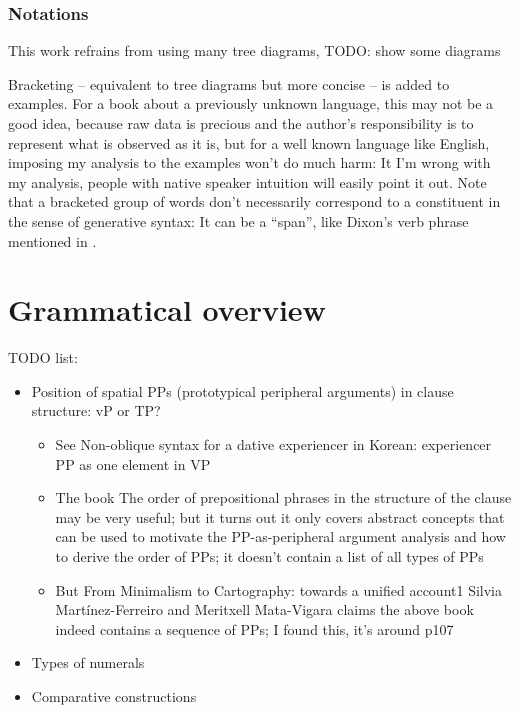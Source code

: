 \documentclass[UTF8, a4paper, oneside, scheme=plain]{ctexrep}
\begin{document}
\subsection{Notations}

This work refrains from using many tree diagrams, TODO: show some diagrams

Bracketing -- equivalent to tree diagrams but more concise -- 
is added to examples.
For a book about a previously unknown language,
this may not be a good idea,
because raw data is precious and 
the author's responsibility is to represent what is observed as it is,
but for a well known language like English,
imposing my analysis to the examples 
won't do much harm:
It I'm wrong with my analysis,
people with native speaker intuition will easily point it out.
Note that a bracketed group of words don't necessarily 
correspond to a constituent in the sense of generative syntax: 
It can be a ``span'', 
like Dixon's verb phrase mentioned in .

\chapter{Grammatical overview}\label{chap:overview}

TODO list:
\begin{itemize}
    \item Position of spatial PPs (prototypical peripheral arguments) in clause structure: vP or TP?
    \begin{itemize}
        \item See Non-oblique syntax for a dative experiencer in Korean: experiencer PP as one element in VP
        \item The book The order of prepositional phrases in the structure of the clause may be very useful;
        but it turns out it only covers abstract concepts that can be used to motivate the PP-as-peripheral argument analysis and how to derive the order of PPs; it doesn't contain a list of all types of PPs
        \item But From Minimalism to Cartography: towards a unified account1
        Silvia Martínez-Ferreiro and Meritxell Mata-Vigara claims the above book indeed contains 
        a sequence of PPs; I found this, it's around p107
    \end{itemize}
    \item Types of numerals 
    \item Comparative constructions
\end{itemize}
\end{document}
